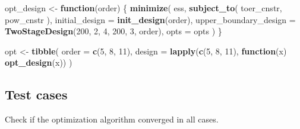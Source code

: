 \documentclass[
]{book}
\newenvironment{Shaded}{\begin{snugshade}}{\end{snugshade}}
\newcommand{\ControlFlowTok}[1]{\textcolor[rgb]{0.13,0.29,0.53}{\textbf{#1}}}
\newcommand{\DataTypeTok}[1]{\textcolor[rgb]{0.13,0.29,0.53}{#1}}
\newcommand{\DecValTok}[1]{\textcolor[rgb]{0.00,0.00,0.81}{#1}}
\newcommand{\KeywordTok}[1]{\textcolor[rgb]{0.13,0.29,0.53}{\textbf{#1}}}
\newcommand{\NormalTok}[1]{#1}
\newcommand{\OperatorTok}[1]{\textcolor[rgb]{0.81,0.36,0.00}{\textbf{#1}}}
\newcommand{\StringTok}[1]{\textcolor[rgb]{0.31,0.60,0.02}{#1}}
\begin{document}
\begin{Shaded}
\begin{Highlighting}[]
\NormalTok{opt\_design \textless{}{-}}\StringTok{ }\ControlFlowTok{function}\NormalTok{(order) \{}
    \KeywordTok{minimize}\NormalTok{(}
\NormalTok{        ess,}
        \KeywordTok{subject\_to}\NormalTok{(}
\NormalTok{            toer\_cnstr,}
\NormalTok{            pow\_cnstr}
\NormalTok{        ),}
        \DataTypeTok{initial\_design =} \KeywordTok{init\_design}\NormalTok{(order),}
        \DataTypeTok{upper\_boundary\_design =} \KeywordTok{TwoStageDesign}\NormalTok{(}\DecValTok{200}\NormalTok{, }\DecValTok{2}\NormalTok{, }\DecValTok{4}\NormalTok{, }\DecValTok{200}\NormalTok{, }\DecValTok{3}\NormalTok{, order),}
        \DataTypeTok{opts =}\NormalTok{ opts}
\NormalTok{    )}
\NormalTok{\}}

\NormalTok{opt \textless{}{-}}\StringTok{ }\KeywordTok{tibble}\NormalTok{(}
  \DataTypeTok{order  =} \KeywordTok{c}\NormalTok{(}\DecValTok{5}\NormalTok{, }\DecValTok{8}\NormalTok{, }\DecValTok{11}\NormalTok{),}
  \DataTypeTok{design =} \KeywordTok{lapply}\NormalTok{(}\KeywordTok{c}\NormalTok{(}\DecValTok{5}\NormalTok{, }\DecValTok{8}\NormalTok{, }\DecValTok{11}\NormalTok{), }\ControlFlowTok{function}\NormalTok{(x) }\KeywordTok{opt\_design}\NormalTok{(x))}
\NormalTok{)}
\end{Highlighting}
\end{Shaded}

\hypertarget{test-cases-10}{%
\subsection{Test cases}\label{test-cases-10}}

Check if the optimization algorithm converged in all cases.

\begin{Shaded}
\end{Shaded}
\end{document}
